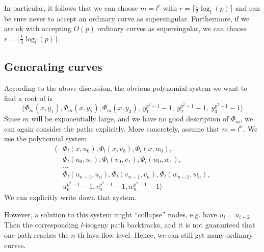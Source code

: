 In particular, it follows that we can choose $m = l^r$ with $r = \lceil \frac 1 2 \log_l(p) \rceil$ and can be sure never to accept an ordinary curve as supersingular.
Furthermore, if we are ok with accepting $O(p)$ ordinary curves as supersingular, we can choose $r = \lceil \frac 1 3 \log_l(p) \rceil$.

\subsection{Generating curves}
According to the above discussion, the obvious polynomial system we want to find a root of is
\begin{equation*}
    \langle \Phi_m(x, y_1), \Phi_m(x, y_2), \Phi_m(x, y_3), \ y_1^{p^2 - 1} - 1, \ y_2^{p^2 - 1} - 1, \ y_3^{p^2 - 1} - 1 \rangle
\end{equation*}
Since $m$ will be exponentially large, and we have no good description of $\Phi_m$, we can again consider the paths explicitly.
More concretely, assume that $m = l^n$.
We use the polynomial system
\begin{align*}
    \langle &\Phi_l(x, u_0), \Phi_l(x, v_0), \Phi_l(x, w_0), \\
    &\Phi_l(u_0, u_1), \Phi_l(v_0, v_1), \Phi_l(w_0, w_1), \\
    &... \\
    &\Phi_l(u_{n - 1}, u_n), \Phi_l(v_{n - 1}, v_n), \Phi_l(w_{n - 1}, w_n), \\
    &u_n^{p^2 - 1} - 1, v_n^{p^2 - 1} - 1, w_n^{p^2 - 1} - 1 \rangle
\end{align*}
We can explicitly write down that system.

However, a solution to this system might ``collapse'' nodes, e.g. have $u_i = u_{i + 2}$.
Then the corresponding $l$-isogeny path backtracks, and it is not guaranteed that one path reaches the $n$-th lava flow level.
Hence, we can still get many ordinary curves.

